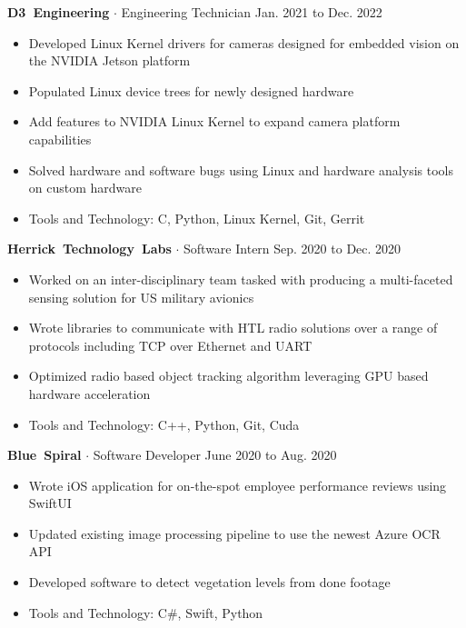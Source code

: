 \documentclass{article}
\newcommand{\rSubSubSection}[1] {
  \textbf{{\fontsize{0.35cm}{0.45cm}\selectfont \hbox{#1}}}
}
\begin{document}
\rSubSubSection{D3 Engineering} $ \cdot $ Engineering Technician \hfill Jan. 2021 to Dec. 2022 \par
\vspace{-10pt}
\begin{itemize}
    \setlength\itemsep{0pt}
    \setlength{\parskip}{0pt}
    \item Developed Linux Kernel drivers for cameras designed for embedded vision on the NVIDIA Jetson platform
    \item Populated Linux device trees for newly designed hardware
    \item Add features to NVIDIA Linux Kernel to expand camera platform capabilities
    \item Solved hardware and software bugs using Linux and hardware analysis tools on custom hardware
    \item Tools and Technology: C, Python, Linux Kernel, Git, Gerrit
\end{itemize}
\vspace{-10pt}

\rSubSubSection{Herrick Technology Labs} $ \cdot $ Software Intern \hfill Sep. 2020 to Dec. 2020 \par
\vspace{-10pt}
\begin{itemize}
    \setlength\itemsep{0pt}
    \setlength{\parskip}{0pt}
    \item Worked on an inter-disciplinary team tasked with producing a multi-faceted sensing solution for US military avionics
    \item Wrote libraries to communicate with HTL radio solutions over a range of protocols including TCP over Ethernet and UART
    \item Optimized radio based object tracking algorithm leveraging GPU based hardware acceleration
    \item Tools and Technology: C++, Python, Git, Cuda
\end{itemize}
\vspace{-10pt}

\rSubSubSection{Blue Spiral} $ \cdot $ Software Developer \hfill June 2020 to Aug. 2020 \par
\vspace{-10pt}
\begin{itemize}
    \setlength\itemsep{0pt}
    \setlength{\parskip}{0pt}
    \item Wrote iOS application for on-the-spot employee performance reviews using SwiftUI
    \item Updated existing image processing pipeline to use the newest Azure OCR API
    \item Developed software to detect vegetation levels from done footage
    \item Tools and Technology: C\#, Swift, Python
\end{itemize}
\vspace{-10pt}
\end{document}

